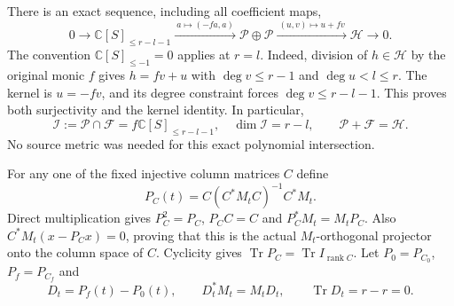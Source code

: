 There is an exact sequence, including all coefficient maps,
\[
 0\longrightarrow\mathbb C[S]_{\leq r-l-1}
 \xrightarrow{\ a\mapsto(-fa,a)\ }
 \mathcal P\oplus\mathcal P
 \xrightarrow{\ (u,v)\mapsto u+fv\ }
 \mathcal H\longrightarrow0.
 \tag{CTR4}
\]
The convention $\mathbb C[S]_{\leq-1}=0$ applies at $r=l$.
Indeed, division of $h\in\mathcal H$ by the original monic $f$ gives
$h=fv+u$ with $\deg v\leq r-1$ and $\deg u<l\leq r$. The kernel is
$u=-fv$, and its degree constraint forces $\deg v\leq r-l-1$.
This proves both surjectivity and the kernel identity. In particular,
\[
 \mathcal I:=\mathcal P\cap\mathcal F
       =f\mathbb C[S]_{\leq r-l-1},\quad
 \dim\mathcal I=r-l,\qquad \mathcal P+\mathcal F=\mathcal H.
 \tag{CTR5}
\]
No source metric was needed for this exact polynomial intersection.

For any one of the fixed injective column matrices $C$ define
\[
 P_C(t)=C(C^*M_tC)^{-1}C^*M_t.
 \tag{CTR6}
\]
Direct multiplication gives $P_C^2=P_C$, $P_CC=C$ and
$P_C^*M_t=M_tP_C$. Also $C^*M_t(x-P_Cx)=0$, proving that this is the
actual $M_t$-orthogonal projector onto the column space of $C$.
Cyclicity gives $\operatorname{Tr}P_C=\operatorname{Tr}I_{\operatorname{rank}C}$.
Let $P_0=P_{C_0}$, $P_f=P_{C_f}$ and
\[
 D_t=P_f(t)-P_0(t),\qquad
 D_t^*M_t=M_tD_t,\qquad \operatorname{Tr}D_t=r-r=0.
 \tag{CTR7}
\]

